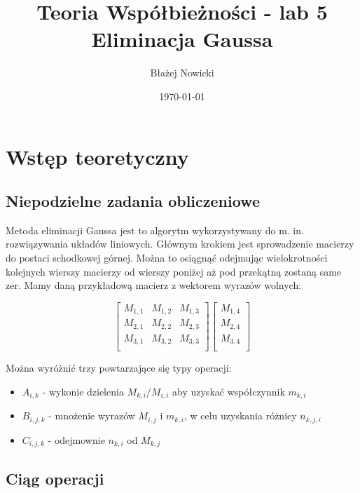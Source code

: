 \documentclass[12pt, letterpaper]{article}
\title{Teoria Współbieżności - lab 5 \\ Eliminacja Gaussa}
\author{Błażej Nowicki}
\date{\today}
\begin{document}
\maketitle
\section{Wstęp teoretyczny}
\subsection{Niepodzielne zadania obliczeniowe}

Metoda eliminacji Gaussa jest to algorytm wykorzystywany do m. in.
rozwiązywania układów liniowych. Głównym krokiem jest sprowadzenie macierzy do postaci schodkowej
górnej. Można to osiągnąć odejmując wielokrotności kolejnych wierszy macierzy od wierszy poniżej
aż pod przekątną zostaną same zer.
Mamy daną przykładową macierz z wektorem wyrazów wolnych:

$$
	\begin{bmatrix}
		M_{1,1} & M_{1,2} & M_{1,3} \\
		M_{2,1} & M_{2,2} & M_{2,3} \\
		M_{3,1} & M_{3,2} & M_{3,3} \\
	\end{bmatrix}
	\begin{bmatrix}
		 M_{1,4} \\
		 M_{2,4} \\
		 M_{3,4} \\
	\end{bmatrix}
$$

Można wyróżnić trzy powtarzające się typy operacji:
\begin{itemize}
    \item $ A_{i, k} $ - wykonie dzielenia $ M_{k,i} / M_{i,i} $ aby uzyskać współczynnik $ m_{k,i} $ 
    \item $ B_{i,j,k} $ - mnożenie wyrazów $ M_{i,j} $ i $ m_{k,i} $, w celu uzyskania różnicy $ n_{k,j,i} $
    \item $ C_{i, j, k} $ - odejmownie $ n_{k,i} $ od $ M_{k,j} $
\end{itemize}

\subsection{Ciąg operacji}
\end{document}
